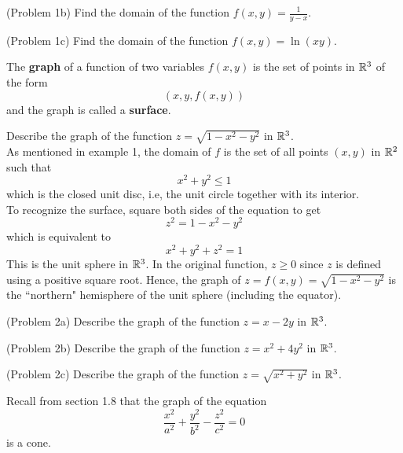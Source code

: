 \documentclass[handout]{ximera}
\begin{document}
\begin{problem}(Problem 1b)
Find the domain of the function $f(x, y) = \frac{1}{y - x}$.\\
\end{problem}

\begin{problem}(Problem 1c)
Find the domain of the function $f(x, y) = \ln(xy)$.\\
\end{problem}


The \textbf{graph} of a function of two variables $f(x, y)$ is the set of points in $\mathbb R^3$ of the form
\[
(x, y, f(x,y))
\]
and the graph is called a \textbf{surface}.



\begin{example}[Example 2]
Describe the graph of the function $z = \sqrt{1 - x^2 - y^2}$ in $\mathbb R^3$.\\
As mentioned in example 1, the domain of $f$ is the set of all points $(x, y)$ in $\mathbb R^2$ such that
\[
x^2 + y^2 \leq 1
\]
which is the closed unit disc, i.e, the unit circle together with its interior.\\
To recognize the surface, square both sides of the equation to get
\[
z^2 = 1 - x^2 - y^2
\]
which is equivalent to
\[
x^2 + y^2 + z^2 = 1
\]
This is the unit sphere in $\mathbb R^3$. In the original function, $z\geq 0$ since $z$ is defined using a positive square root. 
Hence, the graph of $z = f(x, y) = \sqrt{1 - x^2 - y^2}$ is the ``northern" hemisphere of the unit sphere (including the equator).
\end{example}



\begin{problem}(Problem 2a)
Describe the graph of the function $z = x - 2y$ in $\mathbb R^3$.\\
\end{problem}

\begin{problem}(Problem 2b)
Describe the graph of the function $z = x^2 + 4y^2$ in $\mathbb R^3$.\\
\end{problem}

\begin{problem}(Problem 2c)
Describe the graph of the function $z = \sqrt{x^2 + y^2}$ in $\mathbb R^3$.\\
\begin{hint}
Recall from section 1.8 that the graph of the equation
\[
\frac{x^2}{a^2} + \frac{y^2}{b^2} - \frac{z^2}{c^2} = 0
\]
is a cone.
\end{hint}
\end{problem}
\end{document}

